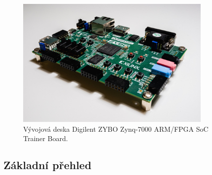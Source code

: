\documentclass[a4paper, twoside, 11pt]{article}
\begin{document}
			\begin{figure}[htbp!]
				\centering
					\includegraphics[width=0.85\textwidth]{src/jpg/digilent-zybo-foto-2.jpg} 
					\caption{Vývojová deska Digilent ZYBO Zynq-7000 ARM/FPGA SoC Trainer Board.}
					\label{fig:digilent-zybo-foto-2}
			\end{figure}

		\subsection{Základní přehled}
\end{document}
